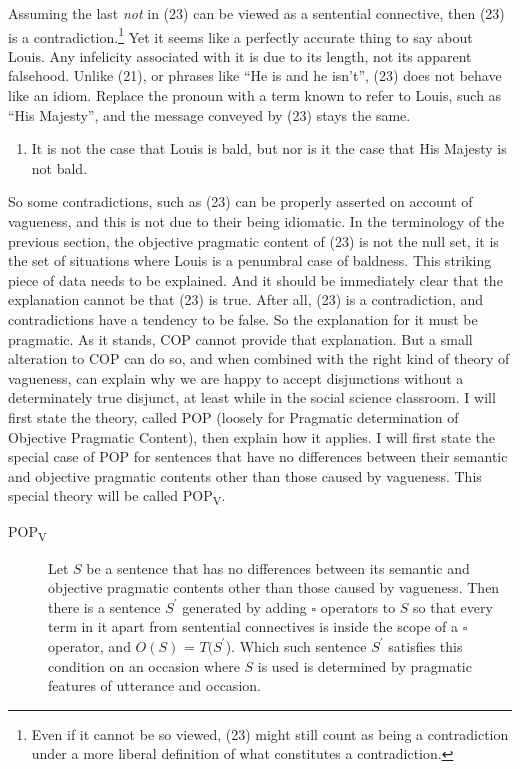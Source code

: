 
\noindent Assuming the last \textit{not} in (23) can be viewed as a sentential connective, then (23) is a contradiction.\footnote{Even if it cannot be so viewed, (23) might still count as being a contradiction under a more liberal definition of what constitutes a contradiction.} Yet it seems like a perfectly accurate thing to say about Louis. Any infelicity associated with it is due to its length, not its apparent falsehood. Unlike (21), or phrases like ``He is and he isn't'', (23) does not behave like an idiom. Replace the pronoun with a term known to refer to Louis, such as ``His Majesty'', and the message conveyed by (23) stays the same.

\begin{enumerate}
\renewcommand{\labelenumi}{(\arabic{enumi}a)}
\setcounter{enumi}{22}
\item It is not the case that Louis is bald, but nor is it the case that His Majesty is not bald.
\end{enumerate}

\noindent So some contradictions, such as (23) can be properly asserted on account of vagueness, and this is not due to their being idiomatic. In the terminology of the previous section, the objective pragmatic content of (23) is not the null set, it is the set of situations where Louis is a penumbral case of baldness. This striking piece of data needs to be explained. And it should be immediately clear that the explanation cannot be that (23) is true. After all, (23) is a contradiction, and contradictions have a tendency to be false. So the explanation for it must be pragmatic. As it stands, COP cannot provide that explanation. But a small alteration to COP can do so, and when combined with the right kind of theory of vagueness, can explain why we are happy to accept disjunctions without a determinately true disjunct, at least while in the social science classroom. I will first state the theory, called POP (loosely for Pragmatic determination of Objective Pragmatic Content), then explain how it applies. I will first state the special case of POP for sentences that have no differences between their semantic and objective pragmatic contents other than those caused by vagueness. This special theory will be called POP\textsubscript{V}.

\begin{description}
\item [POP\textsubscript{V}] Let \(S\) be a sentence that has no differences between its semantic and objective pragmatic contents other than those caused by vagueness. Then there is a sentence \(S^\prime\) generated by adding \(\square\)  operators to \(S\) so that every term in it apart from sentential connectives is inside the scope of a \(\square\)  operator, and \(O(S)\) = \(T(S^\prime\)). Which such sentence \(S^\prime\) satisfies this condition on an occasion where \(S\) is used is determined by pragmatic features of utterance and occasion.
\end{description}

